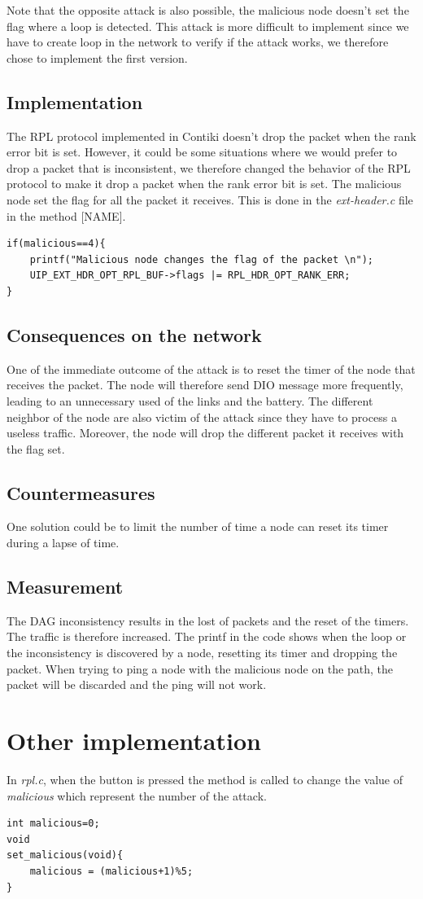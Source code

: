 \documentclass{report}
\begin{document}
Note that the opposite attack is also possible, the malicious node
doesn't set the flag where a loop is detected. This attack is more
difficult to implement since we have to create loop in the network to
verify if the attack works, we therefore chose to implement the first
version.

\subsection*{Implementation}
The \textsc{RPL} protocol implemented in Contiki doesn't drop the packet when
the rank error bit is set. However, it could be some situations where we would
prefer to drop a packet that is inconsistent, we therefore changed the behavior
of the \textsc{RPL} protocol to make it drop a packet when the rank error bit
is set. The malicious node set the flag for all the packet it receives. This is
done in the \textit{ext-header.c} file in the method [NAME].

\begin{lstlisting}
if(malicious==4){
	printf("Malicious node changes the flag of the packet \n");
	UIP_EXT_HDR_OPT_RPL_BUF->flags |= RPL_HDR_OPT_RANK_ERR;
}

\end{lstlisting}
\subsection*{Consequences on the network}
One of the immediate outcome of the attack is to reset the timer of the
node that receives the packet. The node will therefore send \textsc{DIO} message
more frequently, leading to an unnecessary used of the links and the
battery. The different neighbor of the node are also victim of the
attack since they have to process a useless traffic. Moreover, the node
will drop the different packet it receives with the flag set.

\subsection*{Countermeasures}

One solution could be to limit the number of time a node can reset its timer during a lapse of time. 


\subsection*{Measurement}
The DAG inconsistency results in the lost of packets and the reset of
the timers. The traffic is therefore increased. The printf in the code
shows when the loop or the inconsistency is discovered by a node,
resetting its timer and dropping the packet. When trying to ping a node
with the malicious node on the path, the packet will be discarded and
the ping will not work. 

\section{Other implementation}
In \textit{rpl.c}, when the button is pressed the method is called to
change the value of \textit{malicious} which represent the number of the
attack.

\begin{lstlisting}
int malicious=0;
void
set_malicious(void){
	malicious = (malicious+1)%5;
}
\end{lstlisting}
\end{document}
